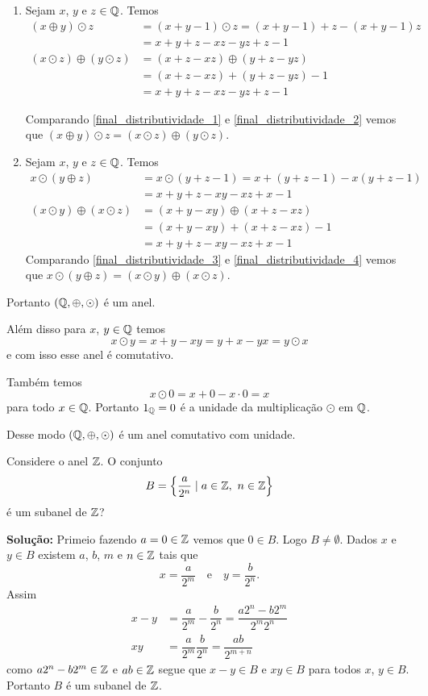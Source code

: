 \documentclass[12pt]{article}
\begin{document}
\begin{enumerate}
	\item Sejam $x$, $y$ e $z \in \mathbb{Q}$. Temos
	\begin{align}
		(x \oplus y)\odot z &= (x + y - 1) \odot z = (x + y - 1) + z - (x + y - 1)z\nonumber \\ &= x + y + z - xz - yz + z - 1\label{final_distributividade_1}\\
		(x \odot z) \oplus (y \odot z) &= (x + z - xz) \oplus (y + z - yz)\nonumber \\ &= (x + z - xz) + (y + z - yz) - 1\nonumber \\ &= x + y + z - xz - yz + z - 1\label{final_distributividade_2}
	\end{align}

	Comparando \eqref{final_distributividade_1} e \eqref{final_distributividade_2} vemos que $(x \oplus y)\odot z = (x \odot z) \oplus (y \odot z)$.

	\item Sejam $x$, $y$ e $z \in \mathbb{Q}$. Temos
	\begin{align}
		x \odot (y \oplus z) &= x \odot (y + z - 1) = x + (y + z - 1) - x(y + z - 1)\nonumber \\ &= x + y + z - xy - xz + x - 1\label{final_distributividade_3}\\
		(x \odot y) \oplus (x \odot z) &= (x + y - xy) \oplus (x + z - xz)\nonumber \\ & = (x + y - xy) + (x + z - xz) - 1\nonumber \\ &= x + y + z - xy - xz + x - 1\label{final_distributividade_4}
	\end{align}
	Comparando \eqref{final_distributividade_3} e \eqref{final_distributividade_4} vemos que $x \odot (y \oplus z) = (x \odot y) \oplus (x \odot z)$.
\end{enumerate}

Portanto $(\mathbb{Q}, \oplus, \odot)$ é um anel.

Além disso para $x$, $y \in \mathbb{Q}$ temos
\[
	x \odot y = x + y - xy = y + x - yx = y \odot x
\]
e com isso esse anel é comutativo.

Também temos
\[
	x \odot 0 = x + 0 - x\cdot 0 = x
\]
para todo $x \in \mathbb{Q}$. Portanto $1_{\mathbb{Q}} = 0$ é a unidade da multiplicação $\odot$ em $\mathbb{Q}$.

Desse modo $(\mathbb{Q}, \oplus, \odot)$ é um anel comutativo com unidade.

\vspace{.5cm}

\questao Considere o anel $\mathbb{Z}$. O conjunto
\[
	B = \left\{ \dfrac{a}{2^n} \mid a \in \z,\ n \in \z\right\}
\]
é um subanel de $\mathbb{Z}$?

\noindent\textbf{Solu\c{c}\~ao:} Primeio fazendo $a = 0 \in \mathbb{Z}$ vemos que $0 \in B$. Logo $B \ne \emptyset$. Dados $x$ e $y \in B$ existem $a$, $b$, $m$ e $n \in \mathbb{Z}$ tais que
\[
	x = \dfrac{a}{2^m} \quad \mbox{e} \quad y = \dfrac{b}{2^n}.
\]
Assim
\begin{align*}
	x - y &= \dfrac{a}{2^m} - \dfrac{b}{2^n} = \dfrac{a2^n - b2^m}{2^m2^n}\\
	xy &= \dfrac{a}{2^m}\dfrac{b}{2^n} = \dfrac{ab}{2^{m + n}}
\end{align*}
como $a2^n - b2^m \in \mathbb{Z}$ e $ab \in \mathbb{Z}$ segue que $x - y \in B$ e $xy \in B$ para todos $x$, $y \in B$. Portanto $B$ é um subanel de $\mathbb{Z}$.
\end{document}
